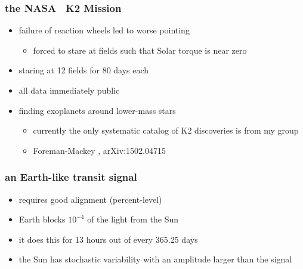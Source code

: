 \documentclass[pdftex]{beamer}
\begin{document}
\begin{frame}
  \frametitle{the NASA \kepler\ K2 Mission}
  \begin{itemize}
  \item failure of reaction wheels led to worse pointing
    \begin{itemize}
    \item forced to stare at fields such that Solar torque is near zero
    \end{itemize}
  \item staring at 12 fields for 80 days each
  \item all data immediately public
  \item finding exoplanets around lower-mass stars
    \begin{itemize}
    \item currently the only systematic catalog of K2 discoveries is from my group
    \item Foreman-Mackey \etal, arXiv:1502.04715
    \end{itemize}
  \end{itemize}
\end{frame}

\begin{frame}
  \frametitle{an Earth-like transit signal}
  \begin{itemize}
  \item requires good alignment (percent-level)
  \item Earth blocks $10^{-4}$ of the light from the Sun
  \item it does this for 13 hours out of every 365.25 days
  \item the Sun has stochastic variability with an amplitude larger than the signal
  \end{itemize}
\end{frame}
\end{document}
